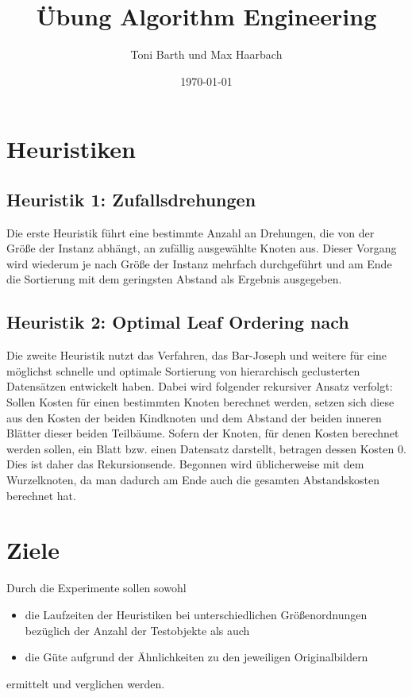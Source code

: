 \documentclass[a4paper, 10pt, twoside, onecolumn, parskip]{scrartcl}
\title{Übung Algorithm Engineering} %
\author{{Toni Barth} und {Max Haarbach}} %
\date{\today}            %
\begin{document}
    \maketitle                %

    \section{Heuristiken} \label{sec:heuristiken}

    \subsection{Heuristik 1: Zufallsdrehungen}

    Die erste Heuristik führt eine bestimmte Anzahl an Drehungen, die von der Größe der Instanz abhängt, an zufällig ausgewählte Knoten aus.
    Dieser Vorgang wird wiederum je nach Größe der Instanz mehrfach durchgeführt und am Ende die Sortierung mit dem geringsten Abstand als Ergebnis ausgegeben.

    \subsection{Heuristik 2: Optimal Leaf Ordering nach \cite{bar2001fast}}

    Die zweite Heuristik nutzt das Verfahren, das Bar-Joseph und weitere für eine möglichst schnelle und optimale Sortierung von hierarchisch geclusterten Datensätzen entwickelt haben.
    Dabei wird folgender rekursiver Ansatz verfolgt:
    Sollen Kosten für einen bestimmten Knoten berechnet werden, setzen sich diese aus den Kosten der beiden Kindknoten und dem Abstand der beiden inneren Blätter dieser beiden Teilbäume.
    Sofern der Knoten, für denen Kosten berechnet werden sollen, ein Blatt bzw. einen Datensatz darstellt, betragen dessen Kosten $0$.
    Dies ist daher das Rekursionsende.
    Begonnen wird üblicherweise mit dem Wurzelknoten, da man dadurch am Ende auch die gesamten Abstandskosten berechnet hat.

    \section{Ziele} \label{sec:ziele}

    Durch die Experimente sollen sowohl
    \begin{itemize}
        \item die Laufzeiten der Heuristiken bei unterschiedlichen Größenordnungen bezüglich der Anzahl der Testobjekte als auch
        \item die Güte aufgrund der Ähnlichkeiten zu den jeweiligen Originalbildern
    \end{itemize}
    ermittelt und verglichen werden.
\end{document}

